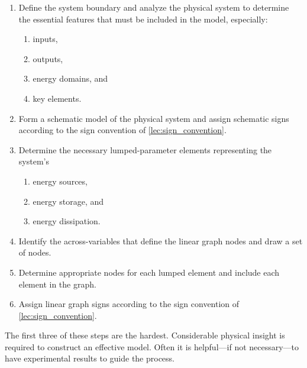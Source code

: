 \documentclass[dynamic_systems.tex]{subfiles}
\begin{document}
\begin{enumerate}
	\item Define the system boundary and analyze the physical system to determine the essential features that must be included in the model, especially:
	\begin{enumerate}
		\item inputs,
		\item outputs,
		\item energy domains, and
		\item key elements.
	\end{enumerate}
	\item Form a schematic model of the physical system and assign schematic signs according to the sign convention of \autoref{lec:sign_convention}.
	\item Determine the necessary lumped-parameter elements representing the system's
	\begin{enumerate}
		\item energy sources,
		\item energy storage, and
		\item energy dissipation.
	\end{enumerate}
	\item Identify the across-variables that define the linear graph nodes and draw a set of nodes.
	\item Determine appropriate nodes for each lumped element and include each element in the graph.
	\item Assign linear graph signs according to the sign convention of \autoref{lec:sign_convention}.
\end{enumerate}

The first three of these steps are the hardest.
Considerable physical insight is required to construct an effective model.
Often it is helpful---if not necessary---to have experimental results to guide the process.
\tags{}


\end{document}
